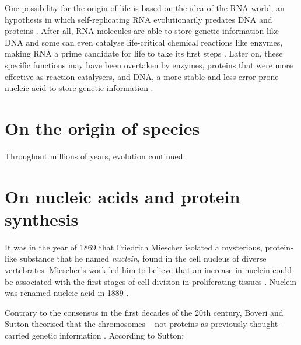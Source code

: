 One possibility for the origin of life is based on the idea of %
the RNA world, an hypothesis in which self-replicating RNA evolutionarily predates DNA and proteins \cite{gilbert:1986td}. After all, RNA molecules are able to store genetic information like DNA and some can even catalyse life-critical chemical reactions like enzymes, making RNA a prime candidate for life to take its first steps \cite{gilbert:1986td}. Later on, these specific functions may have been overtaken by enzymes, proteins that were more effective as reaction catalysers, and DNA, a more stable and less error-prone nucleic acid to store genetic information \cite{gilbert:1986td}.




\section{On the origin of species}

Throughout millions of years, evolution continued.

\section{On nucleic acids and protein synthesis}

It was in the year of 1869 that Friedrich Miescher isolated a mysterious, protein-like substance that he named \emph{nuclein}, found in the cell nucleus of diverse vertebrates. Miescher's work led him to believe that an increase in nuclein could be associated with the first stages of cell division in proliferating tissues \cite{dahm:2005wx}. Nuclein was renamed nucleic acid in 1889 \cite{dahm:2005wx}.



Contrary to the consensus in the first decades of the 20th century, Boveri and Sutton theorised that the chromosomes -- not proteins as previously thought -- carried genetic information \cite{sutton:1902tx,dahm:2005wx}. According to Sutton:

